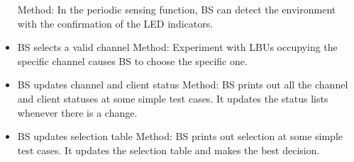 \begin{itemize}
  Method: In the periodic sensing function, BS can detect the environment with the confirmation of the LED indicators.
  \item BS selects a valid channel\newline 
  Method: Experiment with LBUs occupying the specific channel causes BS to choose the specific one. 
  \item BS updates channel and client status\newline
  Method: BS prints out all the channel and client statuses at some simple test cases. It updates the status lists whenever there is a change.
  \item BS updates selection table\newline
  Method: BS prints out selection at some simple test cases. It updates the selection table and makes the best decision.
\end{itemize}

